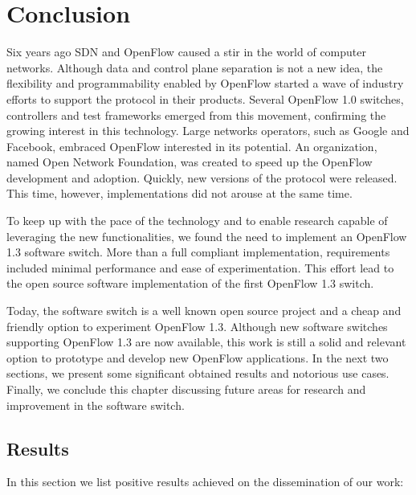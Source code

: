 \chapter{Conclusion}
\label{cap:conclusion}

Six years ago SDN and OpenFlow caused a stir in the world of computer networks. Although data and control plane separation is not a new idea, the flexibility and programmability enabled by OpenFlow started a wave of industry efforts to support the protocol in their products. Several OpenFlow 1.0 switches, controllers and test frameworks emerged from this movement, confirming the growing interest in this technology. Large networks operators, such as Google and Facebook, embraced OpenFlow interested in its potential. An organization, named Open Network Foundation, was created to speed up the OpenFlow development and adoption. Quickly, new versions of the protocol were released. This time, however, implementations did not arouse at the same time.

To keep up with the pace of the technology and to enable research capable of leveraging the new functionalities, we found the need to implement an OpenFlow 1.3 software switch. More than a full compliant implementation, requirements included minimal performance and ease of experimentation. This effort lead to the open source software implementation of the first OpenFlow 1.3 switch. 

Today, the software switch is a well known open source project and a cheap and friendly option to experiment OpenFlow 1.3. Although new software switches supporting OpenFlow 1.3 are now available, this work is still a solid and relevant option to prototype and develop new OpenFlow applications. In the next two sections, we present some significant obtained results and notorious use cases. Finally, we conclude this chapter discussing future areas for research and improvement in the software switch.     

\section{Results}
\label{sec:results}

In this section we list positive results achieved on the dissemination of our work:  

